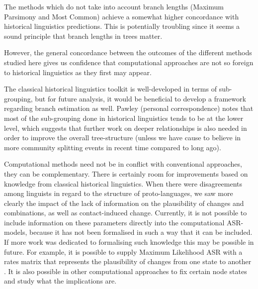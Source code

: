 \documentclass[12pt,letterpaper]{article}
\begin{document}
The methods which do not take into account branch lengths (Maximum Parsimony and Most Common) achieve a somewhat higher concordance with historical linguistics predictions. This is potentially troubling since it seems a sound principle that branch lengths in trees matter.

However, the general concordance between the outcomes of the different methods studied here gives us confidence that computational approaches are not so foreign to historical linguistics as they first may appear. 

The classical historical linguistics toolkit is well-developed in terms of sub-grouping, but for future analysis, it would be beneficial to develop a framework regarding branch estimation as well. Pawley (personal correspondence) notes that most of the sub-grouping done in historical linguistics tends to be at the lower level, which suggests that further work on deeper relationships is also needed in order to improve the overall tree-structure (unless we have cause to believe in more community splitting events in recent time compared to long ago). 

Computational methods need not be in conflict with conventional approaches, they can be complementary. There is certainly room for improvements based on knowledge from classical historical linguistics. When there were disagreements among linguists in regard to the structure of proto-languages, we saw more clearly the impact of the lack of information on the plausibility of changes and combinations, as well as contact-induced change. Currently, it is not possible to include information on these parameters directly into the computational ASR-models, because it has not been formalised in such a way that it can be included. If more work was dedicated to formalising such knowledge this may be possible in future. For example, it is possible to supply Maximum Likelihood ASR with a rates matrix that represents the plausibility of changes from one state to another \citep[8-9]{R-corHMM}. It is also possible in other computational approaches to fix certain node states and study what the implications are.


\end{document}
